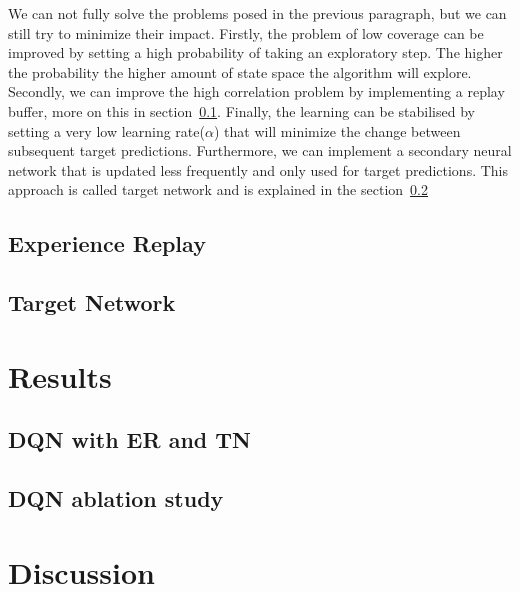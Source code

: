 \documentclass{article}
\begin{document}
We can not fully solve the problems posed in the previous paragraph, but we can still try to minimize their impact.
Firstly, the problem of low coverage can be improved by setting a high probability of taking an exploratory step.
The higher the probability the higher amount of state space the algorithm will explore.
Secondly, we can improve the high correlation problem by implementing a replay buffer, more on this in section~\ref{subsec:experience-replay}.
Finally, the learning can be stabilised by setting a very low learning rate($\alpha$) that will minimize the change between
subsequent target predictions.
Furthermore, we can implement a secondary neural network that is updated less frequently and only used for target predictions.
This approach is called target network and is explained in the section~\ref{subsec:target-network}

\subsection{Experience Replay}
\label{subsec:experience-replay}

\subsection{Target Network}
\label{subsec:target-network}


\section{Results}
\label{sec:results}

\subsection{DQN with ER and TN}
\label{subsec:dqn-with-er-and-tn}


\subsection{DQN ablation study}
\label{subsec:dqn-ablation-study}


\section{Discussion}
\label{sec:discussion}
\end{document}
